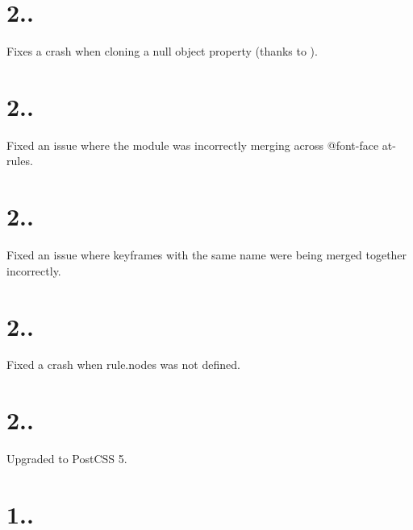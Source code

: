 \section*{2..}


\begin{DoxyItemize}
\item Fixes a crash when cloning a {\ttfamily null} object property (thanks to ).
\end{DoxyItemize}

\section*{2..}


\begin{DoxyItemize}
\item Fixed an issue where the module was incorrectly merging across {\ttfamily @font-\/face} at-\/rules.
\end{DoxyItemize}

\section*{2..}


\begin{DoxyItemize}
\item Fixed an issue where keyframes with the same name were being merged together incorrectly.
\end{DoxyItemize}

\section*{2..}


\begin{DoxyItemize}
\item Fixed a crash when {\ttfamily rule.\+nodes} was not defined.
\end{DoxyItemize}

\section*{2..}


\begin{DoxyItemize}
\item Upgraded to Post\+C\+SS 5.
\end{DoxyItemize}

\section*{1..}


